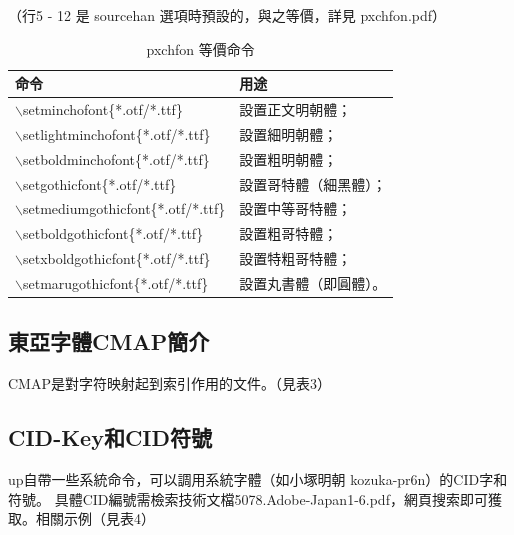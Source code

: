 （行5 - 12 是 sourcehan 選項時預設的，與之等價，詳見 pxchfon.pdf）

\begin{table}[H]
\begin{center}
\caption{pxchfon 等價命令}
{\fontsize{8pt}{12}\selectfont\ttfamily
\begin{tabular}{|l|l|}
 \hline
 命令 & 用途 \\ \hline
$\backslash$setminchofont\{*.otf/*.ttf\} & 設置正文明朝體；\\
$\backslash$setlightminchofont\{*.otf/*.ttf\} & 設置細明朝體；\\
$\backslash$setboldminchofont\{*.otf/*.ttf\} & 設置粗明朝體；\\
$\backslash$setgothicfont\{*.otf/*.ttf\} & 設置哥特體（細黑體）；\\
$\backslash$setmediumgothicfont\{*.otf/*.ttf\} & 設置中等哥特體；\\
$\backslash$setboldgothicfont\{*.otf/*.ttf\} & 設置粗哥特體；\\
$\backslash$setxboldgothicfont\{*.otf/*.ttf\} & 設置特粗哥特體；\\
$\backslash$setmarugothicfont\{*.otf/*.ttf\} & 設置丸書體（即圓體）。\\ \hline
\end{tabular} }
\end{center}
\end{table}


\subsection{東亞字體CMAP簡介}
\par{}CMAP是對字符映射起到索引作用的文件。（見表3）

\subsection{CID-Key和CID符號}

\par{}{up\LaTeXe}自帶一些系統命令，可以調用系統字體（如小塚明朝 kozuka-pr6n）的CID字和符號。
具體CID編號需檢索技術文檔{5078.Adobe-Japan1-6.pdf}，網頁搜索即可獲取。相關示例（見表4）


